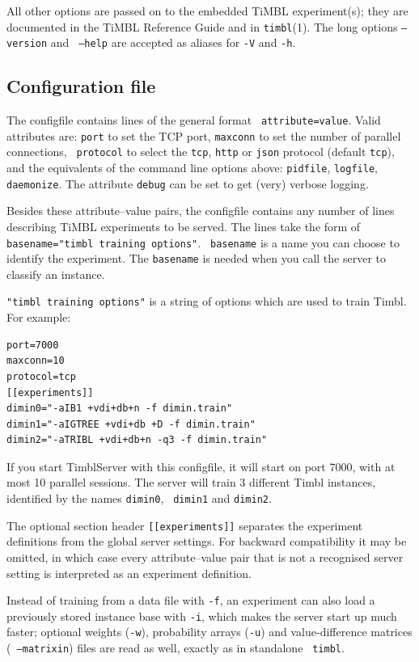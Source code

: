 \documentclass{report}
\begin{document}
All other options are passed on to the embedded TiMBL experiment(s);
they are documented in the TiMBL Reference Guide \cite{Daelemans+26}
and in {\tt timbl}(1). The long options {\tt --version} and {\tt
  --help} are accepted as aliases for {\tt -V} and {\tt -h}.

\subsection{Configuration file}
\label{configfile}

The configfile contains lines of the general format {\tt
  attribute=value}. Valid attributes are: {\tt port} to set the TCP
port, {\tt maxconn} to set the number of parallel connections, {\tt
  protocol} to select the {\tt tcp}, {\tt http} or {\tt json} protocol
(default {\tt tcp}), and the equivalents of the command line options
above: {\tt pidfile}, {\tt logfile}, {\tt daemonize}. The attribute
{\tt debug} can be set to get (very) verbose logging.

Besides these attribute--value pairs, the configfile contains any
number of lines describing TiMBL experiments to be served. The lines
take the form of {\tt basename="timbl training options"}.  {\tt
  basename} is a name you can choose to identify the experiment. The
{\tt basename} is needed when you call the server to classify an
instance.

{\tt "timbl training options"} is a string of options which are used
to train Timbl. For example:

\begin{verbatim}
port=7000
maxconn=10
protocol=tcp
[[experiments]]
dimin0="-aIB1 +vdi+db+n -f dimin.train"
dimin1="-aIGTREE +vdi+db +D -f dimin.train"
dimin2="-aTRIBL +vdi+db+n -q3 -f dimin.train"
\end{verbatim}

If you start TimblServer with this configfile, it will start on port
7000, with at most 10 parallel sessions. The server will train 3
different Timbl instances, identified by the names {\tt dimin0}, {\tt
  dimin1} and {\tt dimin2}.

The optional section header {\tt [[experiments]]} separates the
experiment definitions from the global server settings. For backward
compatibility it may be omitted, in which case every
attribute--value pair that is not a recognised server setting is
interpreted as an experiment definition.

Instead of training from a data file with {\tt -f}, an experiment can
also load a previously stored instance base with {\tt -i}, which makes
the server start up much faster; optional weights ({\tt -w}),
probability arrays ({\tt -u}) and value-difference matrices ({\tt
  --matrixin}) files are read as well, exactly as in standalone {\tt
  timbl}.
\end{document}
